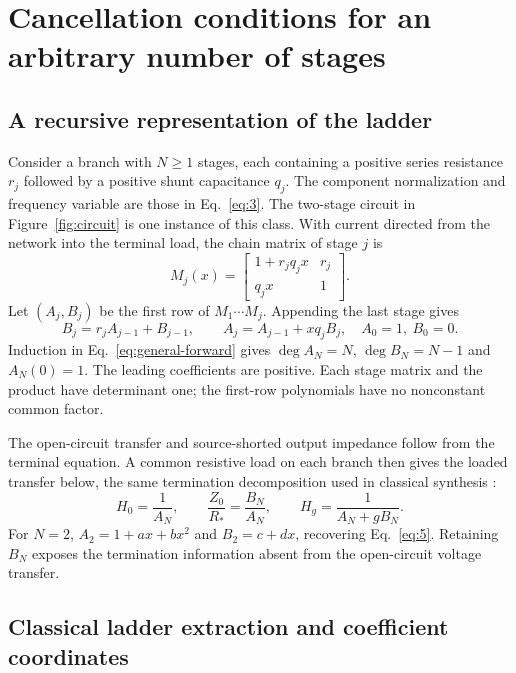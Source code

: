 \section{Cancellation conditions for an arbitrary number of stages}
\label{sec:general-order}

\subsection{A recursive representation of the ladder}

Consider a branch with $N\geq1$ stages, each containing a positive series resistance $r_j$ followed by a positive shunt capacitance $q_j$. The component normalization and frequency variable are those in Eq.~\eqref{eq:3}. The two-stage circuit in Figure~\ref{fig:circuit} is one instance of this class. With current directed from the network into the terminal load, the chain matrix of stage $j$ is
\begin{equation}\label{eq:general-matrix}
M_j(x)=\begin{bmatrix}1+r_jq_jx&r_j\\q_jx&1\end{bmatrix}.
\end{equation}
Let $(A_j,B_j)$ be the first row of $M_1\cdots M_j$. Appending the last stage gives
\begin{equation}\label{eq:general-forward}
B_j=r_jA_{j-1}+B_{j-1},\qquad
A_j=A_{j-1}+xq_jB_j,
\quad A_0=1,\ B_0=0.
\end{equation}
Induction in Eq.~\eqref{eq:general-forward} gives $\deg A_N=N$, $\deg B_N=N-1$ and $A_N(0)=1$. The leading coefficients are positive. Each stage matrix and the product have determinant one; the first-row polynomials have no nonconstant common factor.

The open-circuit transfer and source-shorted output impedance follow from the terminal equation. A common resistive load on each branch then gives the loaded transfer below, the same termination decomposition used in classical synthesis \citep{guillemin1949rcsynthesis}:
\begin{equation}\label{eq:general-transfer}
H_0=\frac1{A_N},\qquad
\frac{Z_0}{R_*}=\frac{B_N}{A_N},\qquad
H_g=\frac1{A_N+gB_N}.
\end{equation}
For $N=2$, $A_2=1+ax+bx^2$ and $B_2=c+dx$, recovering Eq.~\eqref{eq:5}. Retaining $B_N$ exposes the termination information absent from the open-circuit voltage transfer.

\subsection{Classical ladder extraction and coefficient coordinates}

